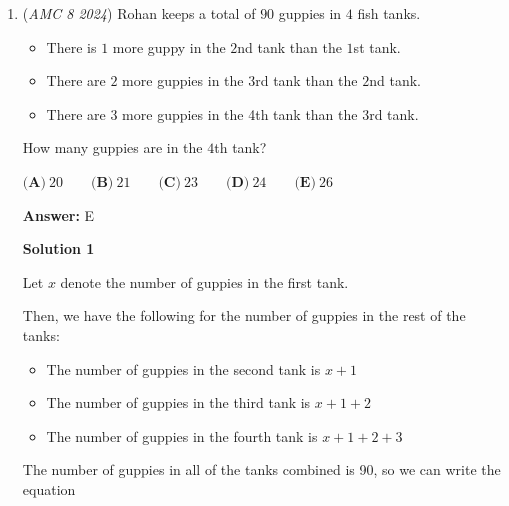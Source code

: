 \begin{enumerate}
 



\textbf{Solution 5}

If the area of $\triangle ABC$ is $12$, then the base times height must be equal to $24$. We can see that the base is equal to $6$, subtracting the smaller x value from the larger x value of the two coordinates. So the change of the $y$ value from point $A$ to point $C$ must be $4$. Adding $4$ to point $A$'s y value gives us $11$, so the answer is $C$.

 - mathdragonmochi 

 


 


 


 


	\item (\textit{AMC 8 2024}) Rohan keeps a total of $90$ guppies in $4$ fish tanks.


 
            \begin{itemize}
        \item There is $1$ more guppy in the $2$nd tank than the $1$st tank.
            \end{itemize}
            
            \begin{itemize}
        \item There are $2$ more guppies in the 3rd tank than the $2$nd tank.
            \end{itemize}
            
            \begin{itemize}
        \item There are $3$ more guppies in the 4th tank than the $3$rd tank.
            \end{itemize}
            How many guppies are in the $4$th tank?


 $\textbf{(A)}\ 20 \qquad \textbf{(B)}\ 21 \qquad \textbf{(C)}\ 23 \qquad \textbf{(D)}\ 24 \qquad \textbf{(E)}\ 26$

 \textbf{Answer: }E



\textbf{Solution 1}

Let $x$ denote the number of guppies in the first tank.

 Then, we have the following for the number of guppies in the rest of the tanks:

 
            \begin{itemize}
        \item The number of guppies in the second tank is $x+1$
        \item The number of guppies in the third tank is $x+1+2$
        \item The number of guppies in the fourth tank is $x+1+2+3$
            \end{itemize}
            The number of guppies in all of the tanks combined is 90, so we can write the equation


\end{enumerate}
